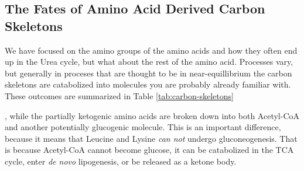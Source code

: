 \documentclass{tufte-handout}
\begin{document}
\subsection{The Fates of Amino Acid Derived Carbon Skeletons}

We have focused on the amino groups of the amino acids and how they often end up in the Urea cycle, but what about the rest of the amino acid.  Processes vary, but generally in proceses that are thought to be in near-equillibrium the carbon skeletons are catabolized into molecules you are probably already familiar with.  These outcomes are summarized in Table \ref{tab:carbon-skeletons}

, while the partially ketogenic amino acids are broken down into both Acetyl-CoA and another potentially glucogenic molecule.  This is an important difference, because it means that Leucine and Lysine \emph{can not} undergo gluconeogenesis.  That is because Acetyl-CoA cannot become glucose, it can be catabolized in the TCA cycle, enter \textit{de novo} lipogenesis, or be released as a ketone body.
\end{document}

